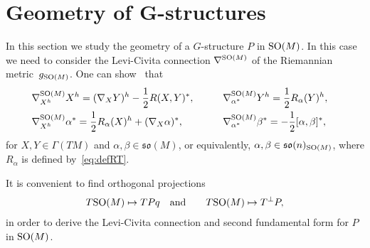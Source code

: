 \documentclass[10pt,a4paper]{amsart}
\numberwithin{equation}{section}
\begin{document}
\section[Geometry of $G$-structures]{Geometry of $\boldsymbol{G}$-structures}\label{section5}

In this section we study the geometry of a $G$-structure $P$ in ${\rm SO}(M)$. In this case we need to consider the Levi-Civita connection $\nabla^{{\rm SO}(M)}$ of the Riemannian metric~$g_{{\rm SO}(M)}$. One can show~\cite{kn} that
\begin{alignat*}{3}
& \nabla^{{\rm SO}(M)}_{X^h}X^h =(\nabla_XY)^h-\frac{1}{2}R(X,Y)^{\ast},\qquad && \nabla^{{\rm SO}(M)}_{\alpha^{\ast}}Y^h =\frac{1}{2}R_{\alpha}(Y)^h,&\\
& \nabla^{{\rm SO}(M)}_{X^h}\alpha^{\ast} =\frac{1}{2}R_{\alpha}(X)^h+(\nabla_X\alpha)^{\ast},\qquad &&
\nabla^{{\rm SO}(M)}_{\alpha^{\ast}}\beta^{\ast} =-\frac{1}{2}[\alpha,\beta]^{\ast},&
\end{alignat*}
for $X,Y\in \Gamma(TM)$ and $\alpha,\beta\in\mathfrak{so}(M)$, or equivalently, $\alpha,\beta\in \mathfrak{so}(n)_{{\rm SO}(M)}$, where $R_{\alpha}$ is def\/ined by~\eqref{eq:defRT}.

It is convenient to f\/ind orthogonal projections
\begin{gather*}
T{\rm SO}(M)\mapsto TPq\quad\textrm{and}\qquad T{\rm SO}(M)\mapsto T^{\bot}P,
\end{gather*}
in order to derive the Levi-Civita connection and second fundamental form for $P$ in ${\rm SO}(M)$.
\end{document}
